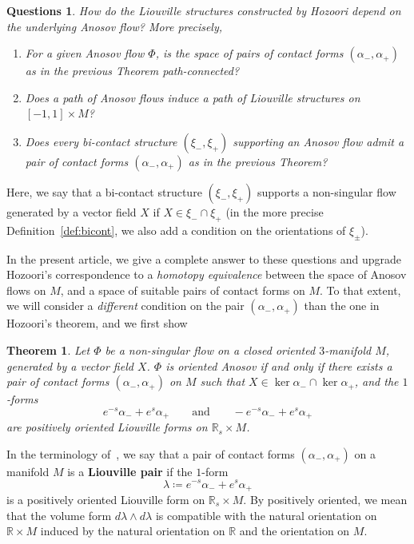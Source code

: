 \documentclass[letterpaper, 11pt]{article}
\numberwithin{equation}{section}
\newtheorem{thmintro}{Theorem}
\newtheorem*{question*}{Questions}
\newcommand{\R}{\mathbb{R}}
\begin{document}
\begin{question*} How do the Liouville structures constructed by Hozoori depend on the underlying Anosov flow? More precisely,
	\begin{enumerate}[label=(\arabic*)]
	\item For a given Anosov flow $\Phi$, is the space of pairs of contact forms $(\alpha_-, \alpha_+)$ as in the previous Theorem path-connected? 
	\item Does a path of Anosov flows induce a path of Liouville structures on $[-1,1] \times M$?
	\item Does every bi-contact structure $(\xi_-, \xi_+)$ supporting an Anosov flow admit a pair of contact forms $(\alpha_-, \alpha_+)$ as in the previous Theorem?
	\end{enumerate}
\end{question*}

Here, we say that a bi-contact structure $(\xi_-, \xi_+)$ supports a non-singular flow generated by a vector field $X$ if $X \in \xi_- \cap \xi_+$ (in the more precise Definition~\ref{def:bicont}, we also add a condition on the orientations of $\xi_\pm$).

\medskip

In the present article, we give a complete answer to these questions and upgrade Hozoori's correspondence to a \emph{homotopy equivalence} between the space of Anosov flows on $M$, and a space of suitable pairs of contact forms on $M$. To that extent, we will consider a \emph{different} condition on the pair $(\alpha_-, \alpha_+)$ than the one in Hozoori's theorem, and we first show

\begin{thmintro} \label{thmintro:supporting}
Let $\Phi$ be a non-singular flow on a closed oriented $3$-manifold $M$, generated by a  vector field $X$. $\Phi$ is oriented Anosov if and only if there exists a pair of contact forms $(\alpha_-, \alpha_+)$ on $M$ such that $X \in \ker \alpha_- \cap \ker \alpha_+$, and the $1$-forms $$ e^{-s} \alpha_- + e^s \alpha_+ \qquad \textrm{and} \qquad -e^{-s} \alpha_- + e^s \alpha_+$$ are positively oriented Liouville forms on $\R_s \times M$.
\end{thmintro}

In the terminology of~\cite[Definition 1]{MNW}, we say that a pair of contact forms $(\alpha_-, \alpha_+)$ on a manifold $M$ is a \textbf{Liouville pair} if the $1$-form $$ \lambda \coloneqq e^{-s} \alpha_- + e^s \alpha_+$$ is a positively oriented Liouville form on $\R_s \times M$. By positively oriented, we mean that the volume form $d\lambda \wedge d\lambda$ is compatible with the natural orientation on $\R \times M$ induced by the natural orientation on $\R$ and the orientation on $M$. 
\end{document}
